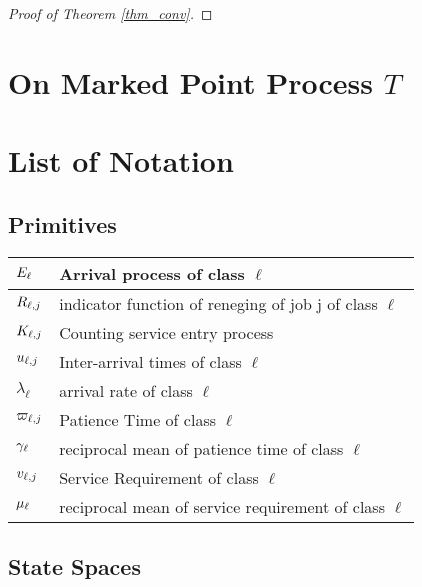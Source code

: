 \documentclass{article}
\theoremstyle{definition}
\numberwithin{equation}{section}
\begin{document}
\begin{proof}[Proof of Theorem \ref{thm_conv}]


\end{proof}





\pagebreak

\appendix


\section{On Marked Point Process $T$}\label{apx_mpp}


\section{List of Notation}

\subsection{Primitives}

\begin{center}
\begin{tabular}{ | l | l | }
\hline
$E_\ell$                 & Arrival process of class $\ell$ \\
\hline
$R_{\ell,j}$               & indicator function of reneging of job j of class $\ell$ \\
\hline
$K_{\ell,j}$               & Counting service entry process \\
\hline
\hline
$u_{\ell,j}$          & Inter-arrival times of class $\ell$\\
\hline
$\lambda_{\ell}$                 & arrival rate of class $\ell$\\
\hline
$\varpi_{\ell,j}$            & Patience Time of class $\ell$\\
\hline
$\gamma_{\ell}$             & reciprocal mean of patience time of class $\ell$\\
\hline
$v_{\ell,j}$          & Service Requirement of class $\ell$\\
\hline
$\mu_\ell$             & reciprocal mean of service requirement of class $\ell$\\
\hline
\end{tabular}
\end{center}


\subsection{State Spaces}
\end{document}
